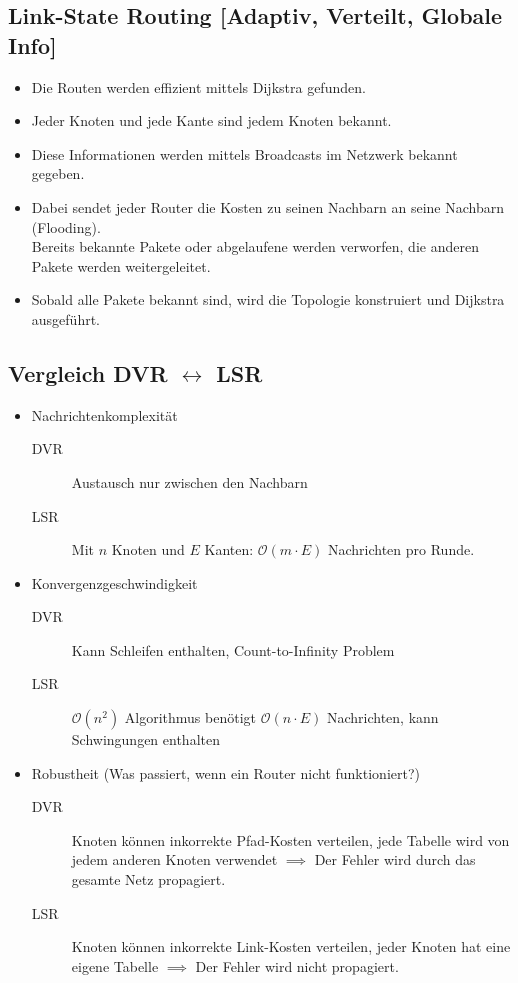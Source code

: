 \documentclass[a4paper, 11pt, accentcolor = tud3b]{tudreport}
\begin{document}
            \subsection{Link-State Routing [Adaptiv, Verteilt, Globale Info]}
				\begin{itemize}
					\item Die Routen werden effizient mittels Dijkstra gefunden.
					\item Jeder Knoten und jede Kante sind jedem Knoten bekannt.
					\item Diese Informationen werden mittels Broadcasts im Netzwerk bekannt gegeben.
					\item Dabei sendet jeder Router die Kosten zu seinen Nachbarn an seine Nachbarn (Flooding). \\ Bereits bekannte Pakete oder abgelaufene werden verworfen, die anderen Pakete werden weitergeleitet.
					\item Sobald alle Pakete bekannt sind, wird die Topologie konstruiert und Dijkstra ausgeführt.
				\end{itemize}

            \subsection{Vergleich DVR \(\leftrightarrow\) LSR}
	            \begin{itemize}
	            	\item Nachrichtenkomplexität
		            	\begin{description}
		            		\item[DVR] Austausch nur zwischen den Nachbarn
		            		\item[LSR] Mit \(n\) Knoten und \(E\) Kanten: \(\mathcal{O}(m \cdot E)\) Nachrichten pro Runde.
		            	\end{description}
	            	\item Konvergenzgeschwindigkeit
		            	\begin{description}
		            		\item[DVR] Kann Schleifen enthalten, Count-to-Infinity Problem
		            		\item[LSR] \(\mathcal{O}(n^2)\) Algorithmus benötigt \(\mathcal{O}(n \cdot E)\) Nachrichten, kann Schwingungen enthalten
		            	\end{description}
	            	\item Robustheit (Was passiert, wenn ein Router nicht funktioniert?)
		            	\begin{description}
		            		\item[DVR] Knoten können inkorrekte Pfad-Kosten verteilen, jede Tabelle wird von jedem anderen Knoten verwendet \(\implies\) Der Fehler wird durch das gesamte Netz propagiert.
		            		\item[LSR] Knoten können inkorrekte Link-Kosten verteilen, jeder Knoten hat eine eigene Tabelle \(\implies\) Der Fehler wird nicht propagiert.
		            	\end{description}
	            \end{itemize}
\end{document}
